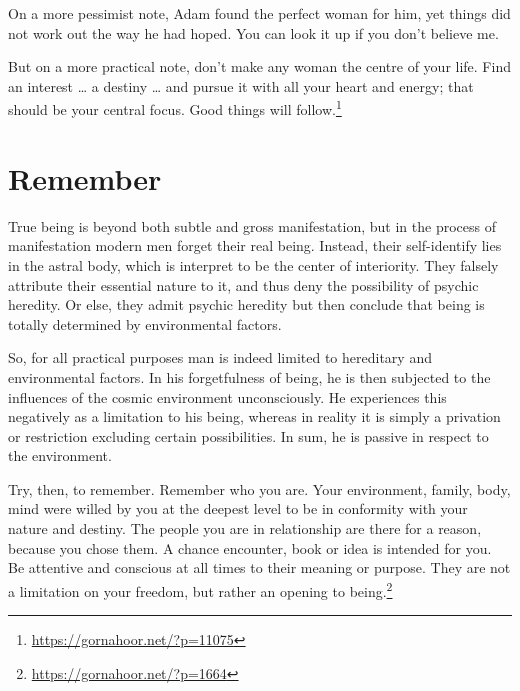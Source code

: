 On a more pessimist note, Adam found the perfect woman for him, yet things did not work out the way he had hoped. You can look it up if you don’t believe me.

But on a more practical note, don’t make any woman the centre of your life. Find an interest … a destiny … and pursue it with all your heart and energy; that should be your central focus. Good things will follow.\footnote{\url{https://gornahoor.net/?p=11075}}

\section{Remember}

True being is beyond both subtle and gross manifestation, but in the process of manifestation modern men forget their real being. Instead, their self-identify lies in the astral body, which is interpret to be the center of interiority. They falsely attribute their essential nature to it, and thus deny the possibility of psychic heredity. Or else, they admit psychic heredity but then conclude that being is totally determined by environmental factors.

So, for all practical purposes man is indeed limited to hereditary and environmental factors. In his forgetfulness of being, he is then subjected to the influences of the cosmic environment unconsciously. He experiences this negatively as a limitation to his being, whereas in reality it is simply a privation or restriction excluding certain possibilities. In sum, he is passive in respect to the environment.

Try, then, to remember. Remember who you are. Your environment, family, body, mind were willed by you at the deepest level to be in conformity with your nature and destiny. The people you are in relationship are there for a reason, because you chose them. A chance encounter, book or idea is intended for you. Be attentive and conscious at all times to their meaning or purpose. They are not a limitation on your freedom, but rather an opening to being.\footnote{\url{https://gornahoor.net/?p=1664}}
